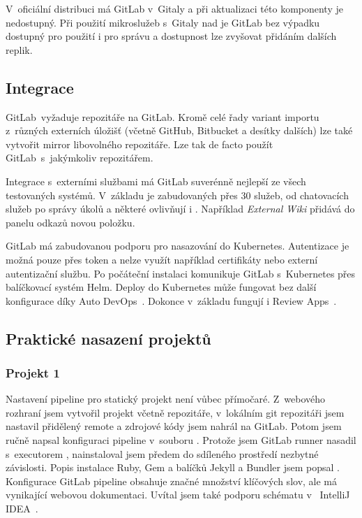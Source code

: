             V~oficiální distribuci má GitLab  v~Gitaly a při aktualizaci této komponenty je nedostupný. Při použití mikroslužeb s~Gitaly nad  je GitLab bez výpadku dostupný pro použití i pro správu a dostupnost lze zvyšovat přidáním dalších replik.

    \subsection{Integrace}
        GitLab~\CI vyžaduje repozitáře na GitLab. Kromě celé řady variant importu z~různých externích úložišť (včetně GitHub, Bitbucket a desítky dalších) lze také vytvořit mirror libovolného repozitáře. Lze tak de facto použít GitLab~\CI s~jakýmkoliv repozitářem.

        Integrace s~externími službami má GitLab suverénně nejlepší ze všech testovaných systémů. V~základu je zabudovaných přes 30 služeb, od chatovacích služeb po správy úkolů a některé ovlivňují i . Například \textit{External Wiki} přidává do panelu odkazů novou položku.

        GitLab má zabudovanou podporu pro nasazování do Kubernetes. Autentizace je možná pouze přes token a nelze využít například certifikáty nebo externí autentizační službu. Po počáteční instalaci komunikuje GitLab s~Kubernetes přes balíčkovací systém Helm. Deploy do Kubernetes může fungovat bez další konfigurace díky Auto DevOps~\cite{gitlab-auto-devops}. Dokonce v~základu fungují i Review Apps~\cite{gitlab-review-apps}.

    \subsection{Praktické nasazení projektů}
        \subsubsection{Projekt 1}
            \label{subsec:gitlab-p1}
            Nastavení pipeline pro statický projekt není vůbec přímočaré. Z~webového rozhraní jsem vytvořil projekt včetně repozitáře, v~lokálním git repozitáři jsem nastavil přidělený remote a zdrojové kódy jsem nahrál na GitLab. Potom jsem ručně napsal konfiguraci pipeline v~souboru . Protože jsem GitLab runner nasadil s~executorem , nainstaloval jsem předem do sdíleného prostředí nezbytné závislosti. Popis instalace Ruby, Gem a balíčků Jekyll a Bundler jsem popsal . Konfigurace GitLab pipeline obsahuje značné množství klíčových slov, ale má vynikající webovou dokumentaci. Uvítal jsem také podporu schématu v~ IntelliJ IDEA~\cite{idea-gitlab-plugin}.

